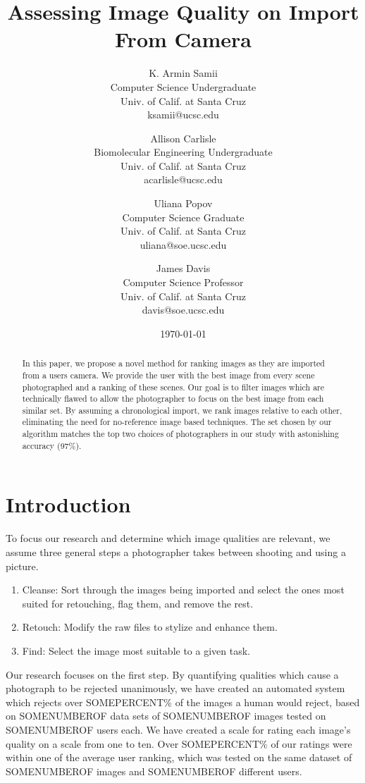 \documentclass[twocolumn]{article}
\title{
Assessing Image Quality on Import From Camera
} %
\author{
K. Armin Samii\\
Computer Science Undergraduate\\
Univ. of Calif. at Santa Cruz\\
ksamii@ucsc.edu
\and
Allison Carlisle\\
Biomolecular Engineering Undergraduate\\
Univ. of Calif. at Santa Cruz\\
acarlisle@ucsc.edu
\and
Uliana Popov\\
Computer Science Graduate\\
Univ. of Calif. at Santa Cruz\\
uliana@soe.ucsc.edu
\and
James Davis\\
Computer Science Professor\\
Univ. of Calif. at Santa Cruz\\
davis@soe.ucsc.edu
}
\date{\today}
\begin{document}
\maketitle
\begin{abstract}
In this paper, we propose a novel method for ranking images as they are imported from a users camera. We provide the user with the best image from every scene photographed and a ranking of these scenes. Our goal is to filter images which are technically flawed to allow the photographer to focus on the best image from each similar set. By assuming a chronological import, we rank images relative to each other, eliminating the need for no-reference image based techniques. The set chosen by our algorithm matches the top two choices of photographers in our study with astonishing accuracy (97\%).
\end{abstract}
\section{Introduction}
To focus our research and determine which image qualities are relevant, we assume three general steps a photographer takes between shooting and using a picture.
\begin{enumerate}
\item Cleanse: Sort through the images being imported and select the ones most suited for retouching, flag them, and remove the rest.
\item Retouch: Modify the raw files to stylize and enhance them.
\item Find: Select the image most suitable to a given task.
\end{enumerate}
Our research focuses on the first step. By quantifying qualities which cause a photograph to be rejected unanimously, we have created an automated system which rejects over SOMEPERCENT\% of the images a human would reject, based on SOMENUMBEROF data sets of SOMENUMBEROF images tested on SOMENUMBEROF users each. We have created a scale for rating each image's quality on a scale from one to ten. Over SOMEPERCENT\% of our ratings were within one of the average user ranking, which was tested on the same dataset of SOMENUMBEROF images and SOMENUMBEROF different users.
\end{document}

